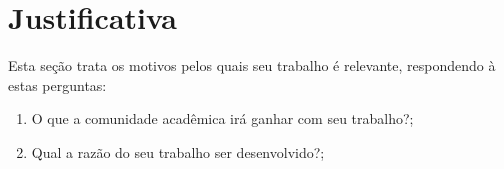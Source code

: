 

\section{Justificativa}
    \label{sec:justificativa}
    
    Esta seção trata os motivos pelos quais seu trabalho é relevante, respondendo à estas perguntas:
    \begin{enumerate}
        \item O que a comunidade acadêmica irá ganhar com seu trabalho?;
        \item Qual a razão do seu trabalho ser desenvolvido?;
    \end{enumerate}
    